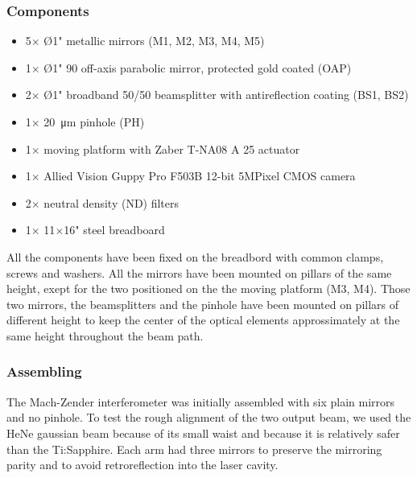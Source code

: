\documentclass[12pt,a4paper,twoside]{article}
\begin{document}

\clearpage
\subsubsection*{Components}
\begin{itemize}
	\item 5$\times$ Ø1" metallic mirrors (M1, M2, M3, M4, M5)
	\item 1$\times$ Ø1" 90 off-axis parabolic mirror, protected gold coated (OAP)
	\item 2$\times$ Ø1" broadband 50/50 beamsplitter with antireflection coating (BS1, BS2)
	\item 1$\times$ \SI{20}{\um} pinhole (PH)
	\item 1$\times$ moving platform with Zaber T-NA08 A 25 actuator
	\item 1$\times$ Allied Vision Guppy Pro F503B 12-bit 5MPixel CMOS camera
	\item 2$\times$ neutral density (ND) filters
	\item 1$\times$ 11$\times$16" steel breadboard
\end{itemize}
All the components have been fixed on the breadbord with common clamps, screws and washers.
All the mirrors have been mounted on pillars of the same height, exept for the two positioned on the the moving platform (M3, M4).
Those two mirrors, the beamsplitters and the pinhole have been mounted on pillars of different height to keep the center of the optical elements approssimately at the same height throughout the beam path.

\subsubsection{Assembling}
The Mach-Zender interferometer was initially assembled with six plain mirrors and no pinhole.
To test the rough alignment of the two output beam, we used the HeNe gaussian beam because of its small waist and because it is relatively safer than the Ti:Sapphire.
Each arm had three mirrors to preserve the mirroring parity and to avoid retroreflection into the laser cavity.
\end{document}
